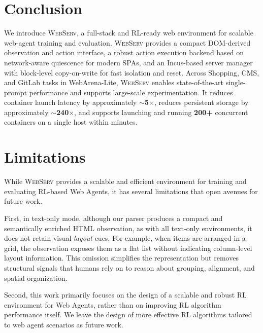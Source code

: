 \documentclass{article}
\DeclareRobustCommand{\projectname}{\textsc{WebServ}\xspace}
\begin{document}
\section{Conclusion}

We introduce \projectname, a full-stack and RL-ready web environment for scalable web-agent training and evaluation. \projectname provides a compact DOM-derived observation and action interface, a robust action execution backend based on network-aware quiescence for modern SPAs, and an Incus-based server manager with block-level copy-on-write for fast isolation and reset. Across Shopping, CMS, and GitLab tasks in WebArena-Lite, \projectname enables state-of-the-art single-prompt performance and supports large-scale experimentation. It reduces container launch latency by approximately \textbf{$\sim$5$\times$}, reduces persistent storage by approximately \textbf{$\sim$240$\times$}, and supports launching and running \textbf{200+} concurrent containers on a single host within minutes.

\section*{Limitations}

While \projectname provides a scalable and efficient environment for training and evaluating RL-based Web Agents, it has several limitations that open avenues for future work.

First, in text-only mode, although our parser produces a compact and semantically enriched HTML observation, as with all text-only environments, it does not retain visual \textit{layout} cues. For example, when items are arranged in a grid, the observation exposes them as a flat list without indicating column-level layout information.
This omission simplifies the representation but removes structural signals that humans rely on to reason about grouping, alignment, and spatial organization.

Second, this work primarily focuses on the design of a scalable and robust RL environment for Web Agents, rather than on improving RL algorithm performance itself. We leave the design of more effective RL algorithms tailored to web agent scenarios as future work.
\end{document}

